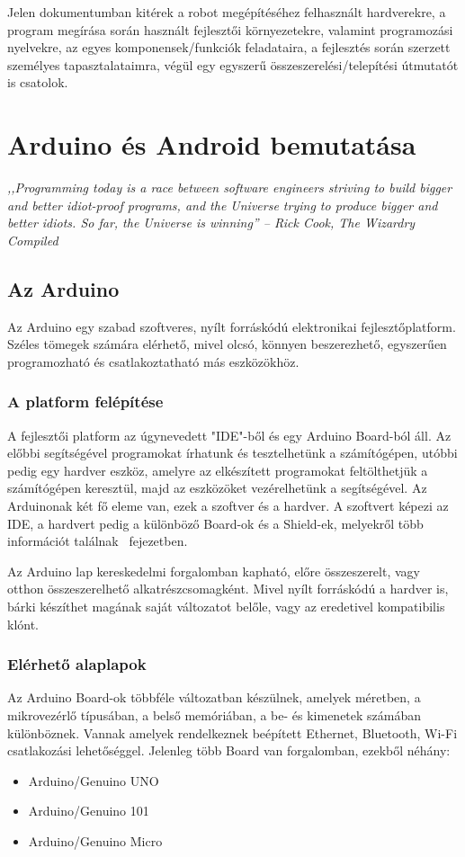 \documentclass[]{thesis-ekf}
\theoremstyle{definition}
\begin{document}
Jelen dokumentumban kitérek a robot megépítéséhez felhasznált hardverekre, a program megírása során használt fejlesztői környezetekre, valamint programozási nyelvekre, az egyes komponensek/funkciók feladataira, a fejlesztés során szerzett személyes tapasztalataimra, végül egy egyszerű összeszerelési/telepítési útmutatót is csatolok.
\chapter{Arduino és Android bemutatása}
\emph{,,Programming today is a race between software engineers striving to build bigger and better idiot-proof programs, and the Universe trying to produce bigger and better idiots. So far, the Universe is winning'' -- Rick Cook, The Wizardry Compiled}
\section{Az Arduino}
Az Arduino egy szabad szoftveres, nyílt forráskódú elektronikai fejlesztőplatform. Széles tömegek számára elérhető, mivel olcsó, könnyen beszerezhető, egyszerűen programozható és csatlakoztatható más eszközökhöz.
\subsection{A platform felépítése}
A fejlesztői platform az úgynevedett "IDE"-ből és egy Arduino Board-ból áll. Az előbbi segítségével programokat írhatunk és tesztelhetünk a számítógépen, utóbbi pedig egy hardver eszköz, amelyre az elkészített programokat feltölthetjük a számítógépen keresztül, majd az eszközöket vezérelhetünk a segítségével. Az Arduinonak két fő eleme van, ezek a szoftver és a hardver. A szoftvert képezi az IDE, a hardvert pedig a különböző Board-ok és a Shield-ek, melyekről több információt találnak \az{\ref{arduino-boards}}~fejezetben.

Az Arduino lap kereskedelmi forgalomban kapható, előre összeszerelt, vagy otthon összeszerelhető alkatrészcsomagként. Mivel nyílt forráskódú a hardver is, bárki készíthet magának saját változatot belőle, vagy az eredetivel kompatibilis klónt.
\subsection{Elérhető alaplapok}\label{arduino-boards}
Az Arduino Board-ok többféle változatban készülnek, amelyek méretben, a mikrovezérlő típusában, a belső memóriában, a be- és kimenetek számában különböznek. Vannak amelyek rendelkeznek beépített Ethernet, Bluetooth, Wi-Fi csatlakozási lehetőséggel. Jelenleg több Board van forgalomban, ezekből néhány:
\begin{itemize}
	\item Arduino/Genuino UNO
	\item Arduino/Genuino 101
	\item Arduino/Genuino Micro
\end{itemize}
\end{document}
